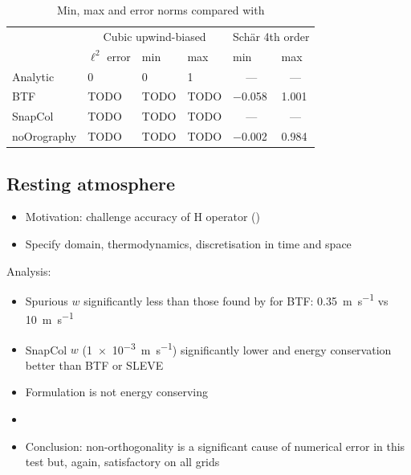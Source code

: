 \documentclass[a4paper]{article}
\begin{document}
\begin{table}
\centering
\begin{tabular}{ l l l l l l }
\toprule
& \multicolumn{3}{c}{Cubic upwind-biased} & \multicolumn{2}{c}{Sch\"ar 4th order} \\
& $\ell^2$ error & min & max & min & max \\
\midrule
Analytic  & 0 & 0 & 1 & \multicolumn{1}{c}{---} & \multicolumn{1}{c}{---} \\
BTF 	  & TODO & TODO & TODO & \num{-0.058} & \num{1.001} \\
SnapCol   & TODO & TODO & TODO & \multicolumn{1}{c}{---} & \multicolumn{1}{c}{---} \\
noOrography & TODO & TODO & TODO & \num{-0.002} & \num{0.984} \\
\bottomrule
\end{tabular}
%
\caption{Min, max and error norms compared with \textcite{schaer2002}}
\label{tab:advection}
\end{table}

\subsection{Resting atmosphere}


\begin{itemize}
	\item Motivation: challenge accuracy of H operator ()
	\item Specify domain, thermodynamics, discretisation in time and space
\end{itemize}

Analysis:
\begin{itemize}
	\item Spurious $w$ significantly less than those found by \textcite{klemp2011} for BTF: \SI{0.35}{\meter\per\second} vs \SI{10}{\meter\per\second}
	\item SnapCol $w$ (\SI{1e-3}{\meter\per\second}) significantly lower and energy conservation better than BTF or SLEVE
	\item Formulation is not energy conserving
	\item {}
	\item Conclusion: non-orthogonality is a significant cause of numerical error in this test but, again, satisfactory on all grids
\end{itemize}
\end{document}
